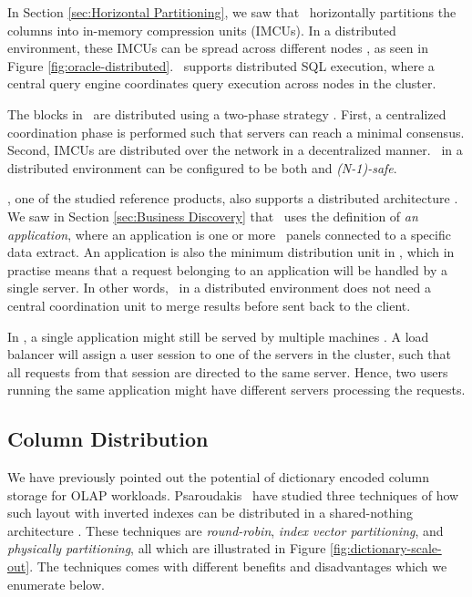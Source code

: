 In Section \ref{sec:Horizontal Partitioning}, we saw that \oracle~horizontally partitions the columns into in-memory compression units (IMCUs). In a distributed environment, these IMCUs can be spread across different nodes \cite{Mukherjee2015-ul}, as seen in Figure \ref{fig:oracle-distributed}. \oracle~supports distributed SQL execution, where a central query engine coordinates query execution across nodes in the cluster. 

The blocks in \oracle~are distributed using a two-phase strategy \cite{Mukherjee2015-ul}. First, a centralized coordination phase is performed such that servers can reach a minimal consensus. Second, IMCUs are distributed over the network in a decentralized manner. \oracle~in a distributed environment can be configured to be both  and \textit{(N-1)-safe}.

\qlikview, one of the studied reference products, also supports a distributed architecture \cite{Qlik2012-ku}. We saw in Section \ref{sec:Business Discovery} that \qlikview~uses the definition of \textit{an application}, where an application is one or more \bd~panels connected to a specific data extract. An application is also the minimum distribution unit in \qlikview, which in practise means that a request belonging to an application will be handled by a single server.  In other words, \qlikview~in a distributed environment does not need a central coordination unit to merge results before sent back to the client.

In \qlikview, a single application might still be served by multiple machines \cite{Qlik2012-ku}. A load balancer will assign a user session to one of the servers in the cluster, such that all requests from that session are directed to the same server. Hence, two users running the same application might have different servers processing the requests.

\subsection{Column Distribution}
\label{sub:Column Distribution}
We have previously pointed out the potential of dictionary encoded column storage for OLAP workloads. Psaroudakis \ea~have studied three techniques of how such layout with inverted indexes can be distributed in a shared-nothing architecture \cite{Psaroudakis2015-lc}. These techniques are \textit{round-robin}, \textit{index vector partitioning}, and \textit{physically partitioning}, all which are illustrated in Figure \ref{fig:dictionary-scale-out}. The techniques comes with different benefits and disadvantages which we enumerate below.

